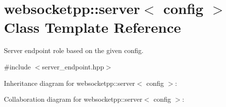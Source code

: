 \hypertarget{classwebsocketpp_1_1server}{}\section{websocketpp\+:\+:server$<$ config $>$ Class Template Reference}
\label{classwebsocketpp_1_1server}


Server endpoint role based on the given config.  




{\ttfamily \#include $<$server\+\_\+endpoint.\+hpp$>$}



Inheritance diagram for websocketpp\+:\+:server$<$ config $>$\+:


Collaboration diagram for websocketpp\+:\+:server$<$ config $>$\+:
